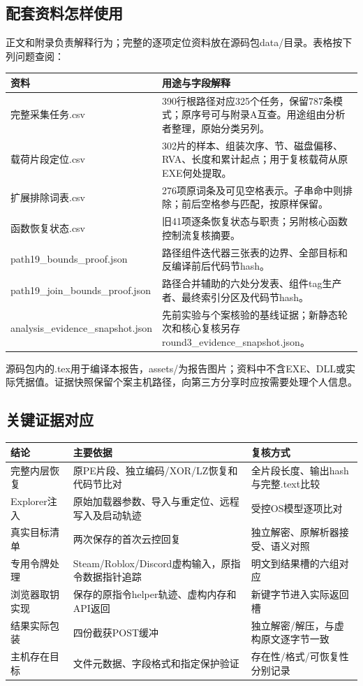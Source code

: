 \documentclass[UTF8,a4paper,zihao=5,fontset=windows]{ctexart}
\newcommand{\code}[1]{{\ttfamily\small #1}}
\begin{document}
\subsection{配套资料怎样使用}
正文和附录负责解释行为；完整的逐项定位资料放在源码包\code{data/}目录。表格按下列问题查阅：
\begin{longtable}{@{}L{48mm}L{102mm}@{}}\toprule 资料 & 用途与字段解释\\\midrule\endhead
\code{完整采集任务.csv} & 390行根路径对应325个任务，保留787条模式；原序号可与附录A互查。用途组由分析者整理，原始分类另列。\\
\code{载荷片段定位.csv} & 302片的样本、组装次序、节、磁盘偏移、RVA、长度和累计起点；用于复核载荷从原EXE何处提取。\\
\code{扩展排除词表.csv} & 276项原词条及可见空格表示。子串命中则排除；前后空格参与匹配，按原样保留。\\
\code{函数恢复状态.csv} & 旧41项逐条恢复状态与职责；另附核心函数控制流复核摘要。\\
\code{path19\_\allowbreak{}bounds\_\allowbreak{}proof.json} & 路径组件迭代器三张表的边界、全部目标和反编译前后代码节hash。\\
\code{path19\_join\_\allowbreak{}bounds\_\allowbreak{}proof.json} & 路径合并辅助的六处分发表、组件tag生产者、最终索引分区及代码节hash。\\
\code{analysis\_\allowbreak{}evidence\_\allowbreak{}snapshot.json} & 先前实验与个案核验的基线证据；新静态轮次和核心复核另存round3\_evidence\_snapshot.json。\\\bottomrule\end{longtable}

源码包内的\code{.tex}用于编译本报告，\code{assets/}为报告图片；资料中不含EXE、DLL或实际凭据值。证据快照保留个案主机路径，向第三方分享时应按需要处理个人信息。

\subsection{关键证据对应}
\begin{longtable}{@{}L{32mm}L{71mm}L{47mm}@{}}\toprule 结论 & 主要依据 & 复核方式\\\midrule\endhead
完整内层恢复 & 原PE片段、独立编码/XOR/LZ恢复和代码节比对 & 全片段长度、输出hash与完整.text比较\\
Explorer注入 & 原始加载器参数、导入与重定位、远程写入及启动轨迹 & 受控OS模型逐项比对\\
真实目标清单 & 两次保存的首次云控回复 & 独立解密、原解析器接受、语义对照\\
专用令牌处理 & Steam/Roblox/Discord虚构输入，原指令数据指针追踪 & 明文到结果槽的六组对应\\
浏览器取钥实现 & 保存的原指令helper轨迹、虚构内存和API返回 & 新键字节进入实际返回槽\\
结果实际包装 & 四份截获POST缓冲 & 独立解密/解压，与虚构原文逐字节一致\\
主机存在目标 & 文件元数据、字段格式和指定保护验证 & 存在性/格式/可恢复性分别记录\\\bottomrule\end{longtable}
\end{document}
